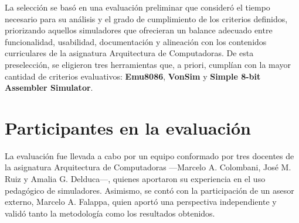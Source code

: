 \documentclass[12pt,oneside]{templates/unerthesis}
\begin{document}
La selección se basó en una evaluación preliminar que consideró el tiempo necesario para su análisis y el grado de cumplimiento de los criterios definidos, priorizando aquellos simuladores que ofrecieran un balance adecuado entre funcionalidad, usabilidad, documentación y alineación con los contenidos curriculares de la asignatura Arquitectura de Computadoras. De esta preselección, se eligieron tres herramientas que, a priori, cumplían con la mayor cantidad de criterios evaluativos: \textbf{Emu8086}, \textbf{VonSim} y \textbf{Simple 8-bit Assembler Simulator}.

\begin{table}[!h]
\centering
\caption{\label{tab:simuladores}Proceso de selección de simuladores}
\centering
{}
\end{table}

\hypertarget{participantes-en-la-evaluaciuxf3n}{%
\section{Participantes en la evaluación}\label{participantes-en-la-evaluaciuxf3n}}

La evaluación fue llevada a cabo por un equipo conformado por tres docentes de la asignatura Arquitectura de Computadoras ---Marcelo A. Colombani, José M. Ruiz y Amalia G. Delduca---, quienes aportaron su experiencia en el uso pedagógico de simuladores. Asimismo, se contó con la participación de un asesor externo, Marcelo A. Falappa, quien aportó una perspectiva independiente y validó tanto la metodología como los resultados obtenidos.
\end{document}
